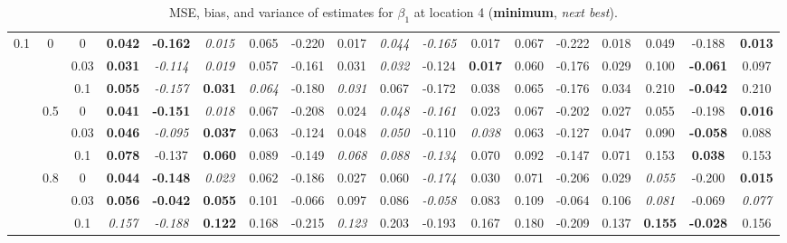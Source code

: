 \documentclass[authoryear, review, 10pt]{elsarticle}
\begin{document}
\begin{sidewaystable}[ht]
\begin{center}
\begin{tabular}{ccc|ccc|ccc|ccc|ccc|ccc}
\multirow{9}{*}{0.1} & \multirow{3}{*}{0} & 0 &   \textbf{0.042} & \textbf{-0.162} & \emph{0.015} & 0.065 & -0.220 & 0.017 & \emph{0.044} & \emph{-0.165} & 0.017 & 0.067 & -0.222 & 0.018 & 0.049 & -0.188 & \textbf{0.013} \\ 
 &  & 0.03 &   \textbf{0.031} & \emph{-0.114} & \emph{0.019} & 0.057 & -0.161 & 0.031 & \emph{0.032} & -0.124 & \textbf{0.017} & 0.060 & -0.176 & 0.029 & 0.100 & \textbf{-0.061} & 0.097 \\ 
 &  & 0.1 &   \textbf{0.055} & \emph{-0.157} & \textbf{0.031} & \emph{0.064} & -0.180 & \emph{0.031} & 0.067 & -0.172 & 0.038 & 0.065 & -0.176 & 0.034 & 0.210 & \textbf{-0.042} & 0.210 \\ \cline{2-18}
 & \multirow{3}{*}{0.5} & 0 &   \textbf{0.041} & \textbf{-0.151} & \emph{0.018} & 0.067 & -0.208 & 0.024 & \emph{0.048} & \emph{-0.161} & 0.023 & 0.067 & -0.202 & 0.027 & 0.055 & -0.198 & \textbf{0.016} \\ 
 &  & 0.03 &   \textbf{0.046} & \emph{-0.095} & \textbf{0.037} & 0.063 & -0.124 & 0.048 & \emph{0.050} & -0.110 & \emph{0.038} & 0.063 & -0.127 & 0.047 & 0.090 & \textbf{-0.058} & 0.088 \\ 
 &  & 0.1 &   \textbf{0.078} & -0.137 & \textbf{0.060} & 0.089 & -0.149 & \emph{0.068} & \emph{0.088} & \emph{-0.134} & 0.070 & 0.092 & -0.147 & 0.071 & 0.153 & \textbf{0.038} & 0.153 \\ \cline{2-18}
 & \multirow{3}{*}{0.8} & 0 &   \textbf{0.044} & \textbf{-0.148} & \emph{0.023} & 0.062 & -0.186 & 0.027 & 0.060 & \emph{-0.174} & 0.030 & 0.071 & -0.206 & 0.029 & \emph{0.055} & -0.200 & \textbf{0.015} \\ 
 &  & 0.03 &   \textbf{0.056} & \textbf{-0.042} & \textbf{0.055} & 0.101 & -0.066 & 0.097 & 0.086 & \emph{-0.058} & 0.083 & 0.109 & -0.064 & 0.106 & \emph{0.081} & -0.069 & \emph{0.077} \\ 
 &  & 0.1 &   \emph{0.157} & \emph{-0.188} & \textbf{0.122} & 0.168 & -0.215 & \emph{0.123} & 0.203 & -0.193 & 0.167 & 0.180 & -0.209 & 0.137 & \textbf{0.155} & \textbf{-0.028} & 0.156 \\ 
  \end{tabular}
\caption{MSE, bias, and variance of estimates for $\beta_1$ at location 4 (\textbf{minimum}, \emph{next best}).}
\end{center}
\end{sidewaystable}
\end{document}
